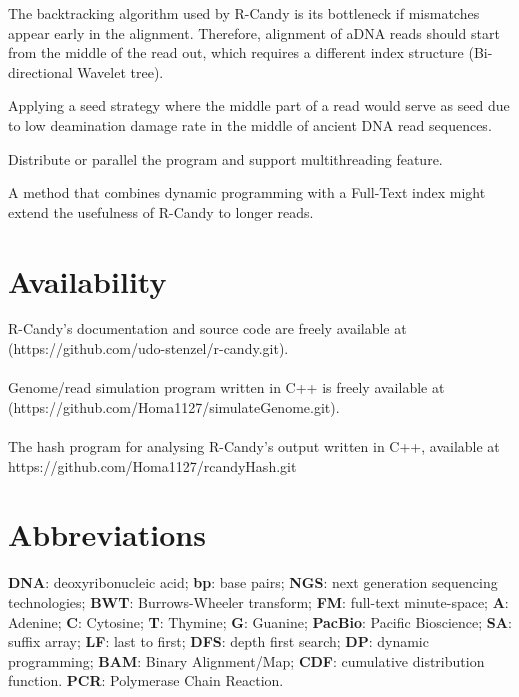 \documentclass[11pt,a4paper]{report}
\begin{document}
The backtracking algorithm used by R-Candy is its bottleneck if mismatches 
appear early in the alignment. 
Therefore, alignment of aDNA reads should start from the middle of the read 
out, which requires a different index structure (Bi-directional Wavelet tree).

Applying a seed strategy where the middle part of a read would serve as seed
due to low deamination damage rate in the middle of  ancient DNA read sequences.

Distribute or parallel the program and support multithreading feature.

A method that combines dynamic programming with a Full-Text index might extend
the usefulness of R-Candy to longer reads.


\section{Availability} \label{Availability}

R-Candy's documentation and source code are freely available at\\
 (https://github.com/udo-stenzel/r-candy.git).
\\\\
Genome/read simulation program written in C++ is freely available at
(https://github.com/Homa1127/simulateGenome.git).
\\\\
The hash program for analysing R-Candy's output written in C++, available at
https://github.com/Homa1127/rcandyHash.git




\section{Abbreviations} \label{Abbreviations}

\textbf{DNA}: deoxyribonucleic acid;
\textbf{bp}: base pairs;
\textbf{NGS}: next generation sequencing technologies;
\textbf{BWT}: Burrows-Wheeler transform;
\textbf{FM}: full-text minute-space;
\textbf{A}: Adenine;
\textbf{C}: Cytosine;
\textbf{T}: Thymine;
\textbf{G}: Guanine;
\textbf{PacBio}: Pacific Bioscience;
\textbf{SA}: suffix array;
\textbf{LF}: last to first;
\textbf{DFS}: depth first search;
\textbf{DP}: dynamic programming;
\textbf{BAM}: Binary Alignment/Map;
\textbf{CDF}: cumulative distribution function.
\textbf{PCR}: Polymerase Chain Reaction.
\end{document}
